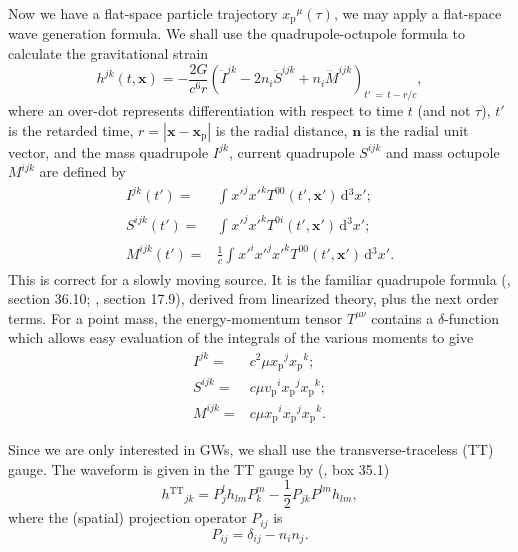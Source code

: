 \documentclass[useAMS,usedcolumn,usegraphicx,usenatbib]{mn2e}
\newcommand{\sub}[1]{\ensuremath{_\mathrm{#1}}}
\newcommand{\super}[1]{\ensuremath{^\mathrm{#1}}}
\newcommand{\dd}{\ensuremath{\mathrm{d}}}
\newcommand{\intd}[4]{\ensuremath{\int_{#1}^{#2}{#3}\,\dd{#4}}}
\newcommand{\recip}[1]{\ensuremath{\frac{1}{#1}}}
\begin{document}
Now we have a flat-space particle trajectory $x\sub{p}^\mu(\tau)$, we may apply a flat-space wave generation formula. We shall use the quadrupole-octupole formula to calculate the gravitational strain \citep{Bekenstein1973, Press1977, Yunes2008}
\begin{equation}
h^{jk}(t, \boldsymbol{x}) = -\frac{2G}{c^6r}\left(\ddot{I}^{jk} - 2n_i\ddot{S}^{ijk} + n_i\dddot{M}^{ijk}\right)_{t'\, =\, t - r/c},
\label{eq:octupole}
\end{equation}
where an over-dot represents differentiation with respect to time $t$ (and not $\tau$), $t'$ is the retarded time, $r = \left|\boldsymbol{x} - \boldsymbol{x}\sub{p}\right|$ is the radial distance, $\boldsymbol{n}$ is the radial unit vector, and the mass quadrupole ${I}^{jk}$, current quadrupole ${S}^{ijk}$ and mass octupole ${M}^{ijk}$ are defined by
\begin{align}
{I}^{jk}\left(t'\right) = {} & \intd{}{}{{x'}^j{x'}^kT^{00}\left(t', \boldsymbol{x'}\right) }{^3x'};\\
{S}^{ijk}\left(t'\right) = {} & \intd{}{}{{x'}^j{x'}^kT^{0i}\left(t', \boldsymbol{x'}\right)}{^3x'};\\
{M}^{ijk}\left(t'\right)  = {} & \recip{c}\intd{}{}{{x'}^i{x'}^j{x'}^kT^{00}\left(t', \boldsymbol{x'}\right)}{^3x'}.
\end{align}
This is correct for a slowly moving source. It is the familiar quadrupole formula (\citealt*{Misner1973}, section 36.10; \citealt{Hobson2006}, section 17.9), derived from linearized theory, plus the next order terms. For a point mass, the energy-momentum tensor $T^{\mu\nu}$ contains a $\delta$-function which allows easy evaluation of the integrals of the various moments to give
\begin{align}
{I}^{jk} = {} & c^2\mu x\sub{p}^jx\sub{p}^k;\\
{S}^{ijk} = {} & c\mu v\sub{p}^ix\sub{p}^jx\sub{p}^k;\\
{M}^{ijk} = {} & c\mu x\sub{p}^ix\sub{p}^jx\sub{p}^k.
\end{align}

Since we are only interested in GWs, we shall use the transverse-traceless (TT) gauge. The waveform is given in the TT gauge by (\citealt{Misner1973}, box 35.1)
\begin{equation}
h\super{TT}_{jk} = P^l_jh_{lm}P^m_k - \recip{2}P_{jk}P^{lm}h_{lm},
\end{equation}
where the (spatial) projection operator $P_{ij}$ is
\begin{equation}
P_{ij} = \delta_{ij} - n_in_j.
\end{equation}
\end{document}

